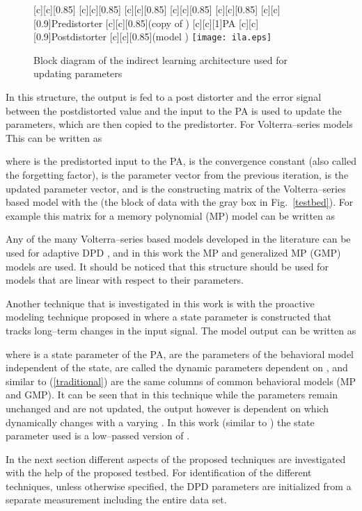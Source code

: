 \documentclass[journal]{IEEEtran}
\begin{document}
\begin{figure}
\centering
{}[c][c][0.85]{} [c][c][0.85]{} [c][c][0.85]{} [c][c][0.85]{} [c][c][0.85]{} [c][c][0.9]{Predistorter} [c][c][0.85]{(copy of )} [c][c][1]{PA} [c][c][0.9]{Postdistorter} [c][c][0.85]{(model )}
\texttt{[image: ila.eps]}
\caption{Block diagram of the indirect learning architecture used for updating parameters}
\label{ila}
\end{figure}

In this structure, the output is fed to a post distorter and the error signal between the postdistorted value and the input to the PA is used to update the parameters, which are then copied to the predistorter. For Volterra--series models This can be written as

where  is the predistorted input to the PA,  is the convergence constant (also called the forgetting factor),  is the parameter vector from the previous iteration,   is the updated parameter vector, and  is the constructing matrix of the Volterra--series based model with the  (the block of data with the gray box in Fig.~\ref{testbed}). For example this matrix for a memory polynomial (MP) model \cite{kim} can be written as

Any of the many Volterra--series based models developed in the literature can be used for adaptive DPD \cite{pedro}, and in this work the MP and generalized MP (GMP) \cite{morgan} models are used. It should be noticed that this structure should be used for models that are linear with respect to their parameters.

Another technique that is investigated in this work is with the proactive modeling technique proposed in \cite{soltaniims} where a state parameter is constructed that tracks long--term changes in the input signal. The model output can be written as

where  is a state parameter of the PA,  are the parameters of the behavioral model independent of the state,  are called the dynamic parameters dependent on , and  similar to (\ref{traditional}) are the same columns of common behavioral models (MP and GMP). It can be seen that in this technique while the parameters remain unchanged and are not updated, the output however is dependent on  which dynamically changes with a varying . In this work (similar to \cite{soltaniims}) the state parameter used is a low--passed version of .

In the next section different aspects of the proposed techniques are investigated with the help of the proposed testbed. For identification of the different techniques, unless otherwise specified, the DPD parameters are initialized from a separate measurement including the entire data set.
\end{document}
